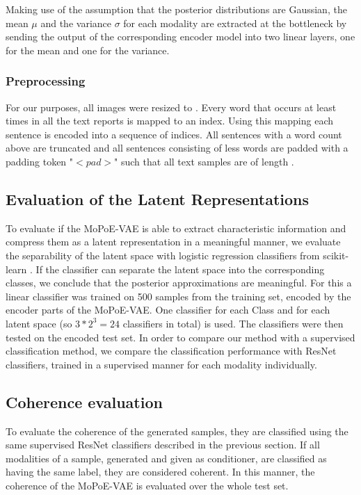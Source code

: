 Making use of the assumption that the posterior distributions are Gaussian, the mean $\mu$ and the variance $\sigma$ for each modality are extracted at the bottleneck by sending the output of the corresponding encoder model into two linear layers, one for the mean and one for the variance.

\subsubsection{Preprocessing}
For our purposes, all images were resized to .
Every word that occurs at least  times in all the text reports is mapped to an index.
Using this mapping each sentence is encoded into a sequence of indices.
All sentences with a word count above  are truncated and all sentences consisting of less words are padded with a padding token "$<pad>$" such that all text samples are of length .

\subsection{Evaluation of the Latent Representations}
To evaluate if the MoPoE-VAE is able to extract characteristic information and compress them as a latent representation in a meaningful manner, we evaluate the separability of the latent space with logistic regression classifiers from scikit-learn \cite{scikit}.
If the classifier can separate the latent space into the corresponding classes, we conclude that the posterior approximations are meaningful.
For this a linear classifier was trained on 500 samples from the training set, encoded by the encoder parts of the MoPoE-VAE.
One classifier for each Class and for each latent space (so $3*2^3 = 24$ classifiers in total) is used.
The classifiers were then tested on the encoded test set.
In order to compare our method with a supervised classification method, we compare the classification performance with ResNet \cite{he2016deep} classifiers, trained in a supervised manner for each modality individually.

\subsection{Coherence evaluation}
To evaluate the coherence of the generated samples, they are classified using the same supervised ResNet classifiers described in the previous section.
If all modalities of a sample, generated and given as conditioner, are classified as having the same label, they are considered coherent.
In this manner, the coherence of the MoPoE-VAE is evaluated over the whole test set.


